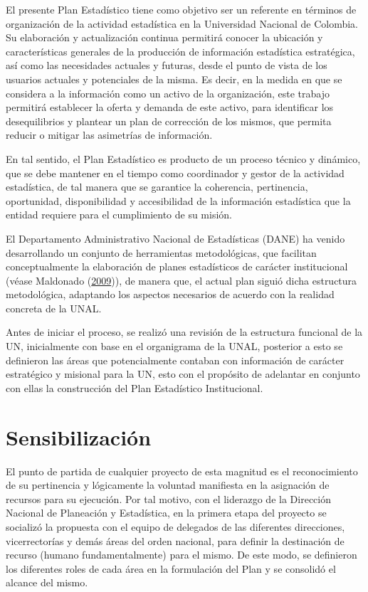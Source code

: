 \documentclass[
]{book}
\begin{document}
El presente Plan Estadístico tiene como objetivo ser un referente en términos de organización de
la actividad estadística en la Universidad Nacional de Colombia. Su elaboración y actualización continua permitirá conocer la
ubicación y características generales de la producción de información estadística estratégica, así
como las necesidades actuales y futuras, desde el punto de vista de los usuarios actuales y
potenciales de la misma. Es decir, en la medida en que se considera a la información como un activo de la organización, este trabajo permitirá establecer la oferta y demanda de este activo,
para identificar los desequilibrios y plantear un plan de corrección de los mismos, que permita
reducir o mitigar las asimetrías de información.

En tal sentido, el Plan Estadístico es producto de un proceso técnico y dinámico, que se debe
mantener en el tiempo como coordinador y gestor de la actividad estadística, de tal manera que
se garantice la coherencia, pertinencia, oportunidad, disponibilidad y accesibilidad de la
información estadística que la entidad requiere para el cumplimiento de su misión.

El Departamento Administrativo Nacional de Estadísticas (DANE) ha venido desarrollando un
conjunto de herramientas metodológicas, que facilitan conceptualmente la elaboración de planes
estadísticos de carácter institucional (véase Maldonado (\protect\hyperlink{ref-maldonado2009metodologia}{2009})), de manera que, el actual plan siguió dicha estructura
metodológica, adaptando los aspectos necesarios de acuerdo con la realidad concreta de la UNAL.

Antes de iniciar el proceso, se realizó una revisión de la estructura funcional de la UN, inicialmente
con base en el organigrama de la UNAL, posterior a esto se definieron las áreas que potencialmente
contaban con información de carácter estratégico y misional para la UN, esto con el propósito de
adelantar en conjunto con ellas la construcción del Plan Estadístico Institucional.

\hypertarget{sensibilizaciuxf3n}{%
\section{Sensibilización}\label{sensibilizaciuxf3n}}

El punto de partida de cualquier proyecto de esta magnitud es el reconocimiento de su pertinencia
y lógicamente la voluntad manifiesta en la asignación de recursos para su ejecución. Por tal
motivo, con el liderazgo de la Dirección Nacional de Planeación y Estadística, en la primera etapa
del proyecto se socializó la propuesta con el equipo de delegados de las diferentes direcciones,
vicerrectorías y demás áreas del orden nacional, para definir la destinación de recurso (humano
fundamentalmente) para el mismo. De este modo, se definieron los diferentes roles de cada área
en la formulación del Plan y se consolidó el alcance del mismo.
\end{document}
